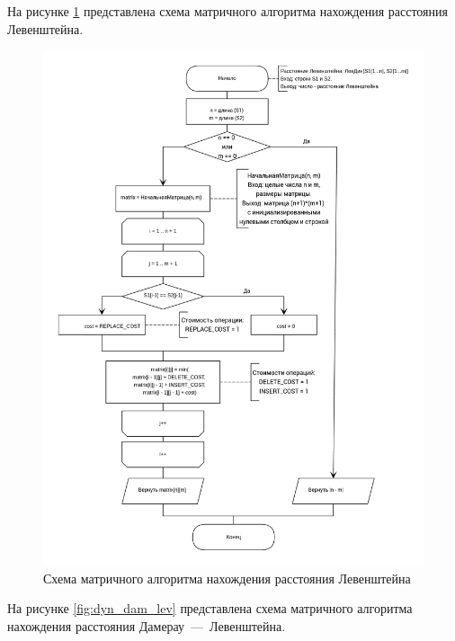 На рисунке \ref{fig:dyn_lev} представлена схема матричного алгоритма нахождения расстояния Левенштейна.

\begin{figure}[!htb]
\centering
\includegraphics[width=\textwidth]{img/levenshtein_dynamic.png}
\caption{Схема матричного алгоритма нахождения расстояния Левенштейна}
\label{fig:dyn_lev}
\end{figure}


На рисунке \ref{fig:dyn_dam_lev} представлена схема матричного алгоритма нахождения расстояния Дамерау~---~Левенштейна.

